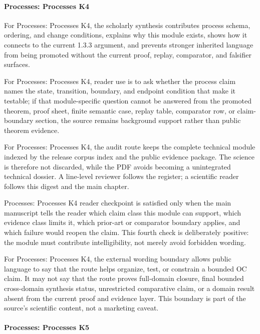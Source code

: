 \paragraph{Processes: Processes K4}

For Processes: Processes K4, the scholarly synthesis contributes process schema, ordering, and change conditions, explains why this module exists, shows how it connects to the current 1.3.3 argument, and prevents stronger inherited language from being promoted without the current proof, replay, comparator, and falsifier surfaces.


For Processes: Processes K4, reader use is to ask whether the process claim names the state, transition, boundary, and endpoint condition that make it testable; if that module-specific question cannot be answered from the promoted theorem, proof sheet, finite semantic case, replay table, comparator row, or claim-boundary section, the source remains background support rather than public theorem evidence.


For Processes: Processes K4, the audit route keeps the complete technical module indexed by the release corpus index and the public evidence package. The science is therefore not discarded, while the PDF avoids becoming a unintegrated technical dossier. A line-level reviewer follows the register; a scientific reader follows this digest and the main chapter.


Processes: Processes K4 reader checkpoint is satisfied only when the main manuscript tells the reader which claim class this module can support, which evidence class limits it, which prior-art or comparator boundary applies, and which failure would reopen the claim. This fourth check is deliberately positive: the module must contribute intelligibility, not merely avoid forbidden wording.


For Processes: Processes K4, the external wording boundary allows public language to say that the route helps organize, test, or constrain a bounded OC claim. It may not say that the route proves full-domain closure, final bounded cross-domain synthesis status, unrestricted comparative claim, or a domain result absent from the current proof and evidence layer. This boundary is part of the source's scientific content, not a marketing caveat.


\paragraph{Processes: Processes K5}

